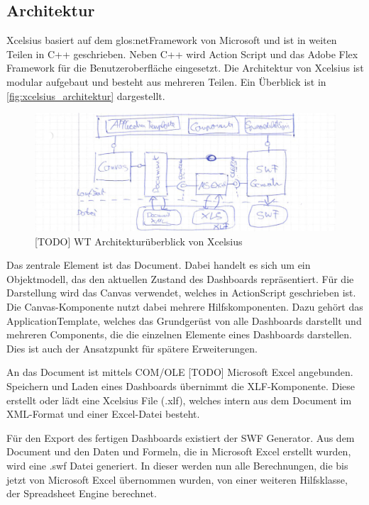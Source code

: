 \subsection{Architektur}

Xcelsius basiert auf dem \gls{glos:netFramework} von Microsoft und ist in weiten Teilen in C++ geschrieben. Neben C++ wird Action Script und das Adobe Flex Framework für die  Benutzeroberfläche eingesetzt. Die Architektur von Xcelsius ist modular aufgebaut und besteht aus mehreren Teilen. Ein Überblick ist in \vref{fig:xcelsius_architektur} dargestellt.

\begin{figure}[h]
\centering
\setlength{\unitlength}{1mm}
\includegraphics[width=15cm]{images/Xcelsius_Architecture.jpg}
\caption{[TODO] WT Architekturüberblick von Xcelsius\label{fig:xcelsius_architektur}}
\end{figure}

Das zentrale Element ist das Document. Dabei handelt es sich um ein Objektmodell, das den aktuellen Zustand des Dashboards repräsentiert. Für die Darstellung wird das Canvas verwendet, welches in ActionScript geschrieben ist. Die Canvas-Komponente nutzt dabei mehrere Hilfskomponenten. Dazu gehört das ApplicationTemplate, welches das Grundgerüst von alle Dashboards darstellt und mehreren Components, die die einzelnen Elemente eines Dashboards darstellen. Dies ist auch der Ansatzpunkt für spätere Erweiterungen.

An das Document ist mittels COM/OLE [TODO] Microsoft Excel angebunden. Speichern und Laden eines Dashboards übernimmt die XLF-Komponente. Diese erstellt oder lädt eine Xcelsius File (.xlf), welches intern aus dem Document im XML-Format und einer Excel-Datei besteht.

Für den Export des fertigen Dashboards existiert der SWF Generator. Aus dem Document und den Daten und Formeln, die in Microsoft Excel erstellt wurden, wird eine .swf Datei generiert. In dieser werden nun alle Berechnungen, die bis jetzt von Microsoft Excel übernommen wurden, von einer weiteren Hilfsklasse, der Spreadsheet Engine berechnet.

